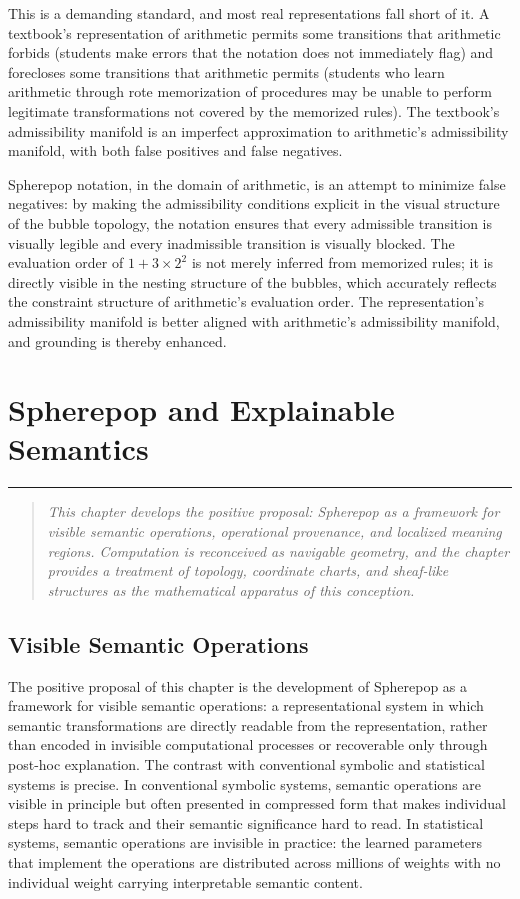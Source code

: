\documentclass[12pt,openany]{book}
\theoremstyle{plain}
\theoremstyle{definition}
\theoremstyle{remark}
\newcommand{\chapterrule}{%
  \vspace{4pt}%
  {\color{SpherepopBlue}\rule{\textwidth}{0.8pt}}%
  \vspace{10pt}%
}
\newenvironment{chapterprecis}{%
  \begin{quote}\small\itshape}{%
  \end{quote}\medskip}
\begin{document}
This is a demanding standard, and most real representations fall short of it. A textbook's representation of arithmetic permits some transitions that arithmetic forbids (students make errors that the notation does not immediately flag) and forecloses some transitions that arithmetic permits (students who learn arithmetic through rote memorization of procedures may be unable to perform legitimate transformations not covered by the memorized rules). The textbook's admissibility manifold is an imperfect approximation to arithmetic's admissibility manifold, with both false positives and false negatives.

Spherepop notation, in the domain of arithmetic, is an attempt to minimize false negatives: by making the admissibility conditions explicit in the visual structure of the bubble topology, the notation ensures that every admissible transition is visually legible and every inadmissible transition is visually blocked. The evaluation order of $1 + 3 \times 2^2$ is not merely inferred from memorized rules; it is directly visible in the nesting structure of the bubbles, which accurately reflects the constraint structure of arithmetic's evaluation order. The representation's admissibility manifold is better aligned with arithmetic's admissibility manifold, and grounding is thereby enhanced.

\chapter{Spherepop and Explainable Semantics}
\chapterrule

\begin{chapterprecis}
This chapter develops the positive proposal: Spherepop as a
framework for visible semantic operations, operational
provenance, and localized meaning regions. Computation is
reconceived as navigable geometry, and the chapter provides a
treatment of topology, coordinate charts, and sheaf-like
structures as the mathematical apparatus of this conception.
\end{chapterprecis}

\section{Visible Semantic Operations}

The positive proposal of this chapter is the development of Spherepop as a framework for visible semantic operations: a representational system in which semantic transformations are directly readable from the representation, rather than encoded in invisible computational processes or recoverable only through post-hoc explanation. The contrast with conventional symbolic and statistical systems is precise. In conventional symbolic systems, semantic operations are visible in principle but often presented in compressed form that makes individual steps hard to track and their semantic significance hard to read. In statistical systems, semantic operations are invisible in practice: the learned parameters that implement the operations are distributed across millions of weights with no individual weight carrying interpretable semantic content.
\end{document}
